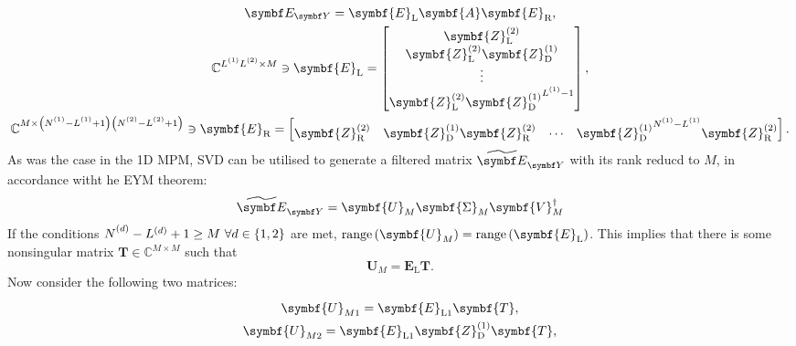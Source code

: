 {\begin{subequations}
    \begin{gather}
        \EY =
        \symbf{E}_{\text{L}}
        \symbf{A}
        \symbf{E}_{\text{R}},\\
        \mathbb{C}^{\Lone \Ltwo \times M} \ni
        \symbf{E}_{\text{L}} =
        \begin{bmatrix}
            \symbf{Z}^{(2)}_{\text{L}} \\
            \symbf{Z}^{(2)}_{\text{L}} \symbf{Z}^{(1)}_{\text{D}} \\
            \vdots \\
            \symbf{Z}^{(2)}_{\text{L}} {\symbf{Z}^{(1)}_{\text{D}}}^{\Lone - 1} \\
        \end{bmatrix},\label{eq:EL}\\
        \mathbb{C}^{M \times \left(\None - \Lone + 1\right)\left(\Ntwo - \Ltwo + 1\right)} \ni
        \symbf{E}_{\text{R}} =
        \begin{bmatrix}
            \symbf{Z}^{(2)}_{\text{R}} &
            \symbf{Z}^{(1)}_{\text{D}} \symbf{Z}^{(2)}_{\text{R}} &
            \cdots &
            {\symbf{Z}^{(1)}_{\text{D}}}^{\None - \Lone} \symbf{Z}^{(2)}_{\text{R}} \\
        \end{bmatrix}.
    \end{gather}
\end{subequations}
As was the case in the \ac{1D} \ac{MPM}, \ac{SVD} can be utilised to generate a
filtered matrix $\EYtilde$ with its rank reducd to $M$, in accordance witht he
\ac{EYM} theorem:
\begin{equation}
    \EYtilde =
        \symbf{U}_M^{\vphantom{\dagger}}
        \symbf{\Sigma}_M^{\vphantom{\dagger}}
        \symbf{V}_M^{\dagger}
\end{equation}
If the conditions $\Nd - L^{(d)} + 1 \geq M\ \forall d \in \lbrace 1, 2
\rbrace$ are met, $\range\left(\symbf{U}_M\right) =
\range\left(\symbf{E}_{\text{L}}\right)$. This implies that there is some
nonsingular matrix $\symbf{T} \in \mathbb{C}^{M \times M}$ such that
\begin{equation}
    \symbf{U}_M = \symbf{E}_{\text{L}} \symbf{T}.
\end{equation}
Now consider the following two matrices:
\begin{subequations}
    \begin{gather}
        \symbf{U}_{M1} = \symbf{E}^{\vphantom{(1)}}_{\text{L}1} \symbf{T},\\
        \symbf{U}_{M2} = \symbf{E}^{\vphantom{(1)}}_{\text{L}1} \symbf{Z}^{(1)}_{\text{D}} \symbf{T},\\

\end{gather}
\end{subequations}}
